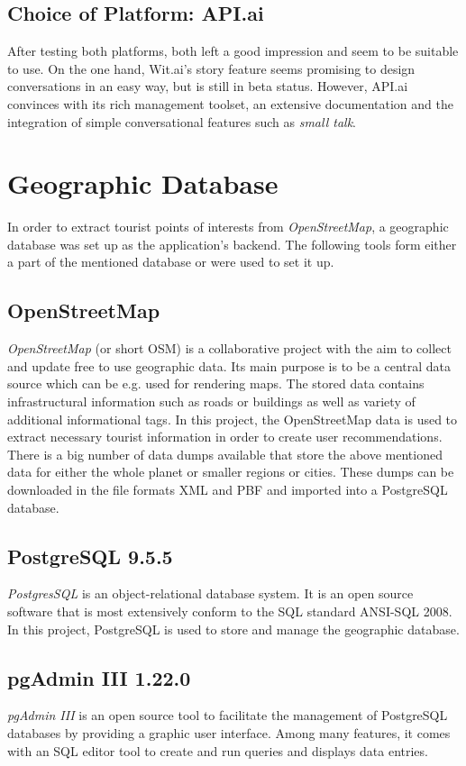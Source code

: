 \subsection{Choice of Platform: API.ai}
After testing both platforms, both left a good impression and seem to be suitable to use. On the one hand, Wit.ai’s story feature seems promising to design conversations in an easy way, but is still in beta status. However, API.ai convinces with its rich management toolset, an extensive documentation and the integration of simple conversational features such as \textit{small talk}.

\section{Geographic Database}
In order to extract tourist points of interests from \textit{OpenStreetMap}, a geographic database was set up as the application’s backend. The following tools form either a part of the mentioned database or were used to set it up.

\subsection{OpenStreetMap}
\textit{OpenStreetMap} \cite{osm:about} (or short OSM) is a collaborative project with the aim to collect and update free to use geographic data. Its main purpose is to be a central data source which can be e.g. used for rendering maps. The stored data contains infrastructural information such as roads or buildings as well as variety of additional informational tags. In this project, the OpenStreetMap data is used to extract necessary tourist information in order to create user recommendations. 
There is a big number of data dumps available that store the above mentioned data for either the whole planet or smaller regions or cities. These dumps can be downloaded in the file formats XML and PBF and imported into a PostgreSQL database.

\subsection{PostgreSQL 9.5.5}
\textit{PostgresSQL} \cite{postgres:about} is an object-relational database system. It is an open source software that is most extensively conform to the SQL standard ANSI-SQL 2008. In this project, PostgreSQL is used to store and manage the geographic database. 

\subsection{pgAdmin III 1.22.0}
\textit{pgAdmin III} \cite{pgadmin} is an open source tool to facilitate the management of PostgreSQL databases by providing a graphic user interface. Among many features, it comes with an SQL editor tool to create and run queries and displays data entries.

